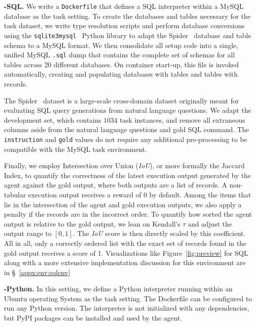 \textbf{\benchmark{}-SQL.} We write a \texttt{Dockerfile} that defines a SQL interpreter within a MySQL database as the task setting.
To create the databases and tables necessary for the task dataset, we write type resolution scripts and perform database conversions using the \texttt{sqlite3mysql}~\cite{sqlite3mysql} Python library to adapt the Spider~\cite{yu-etal-2018-spider} database and table schema to a MySQL format.
We then consolidate all setup code into a single, unified MySQL \texttt{.sql} dump that contains the complete set of schemas for all tables across 20 different databases.
On container start-up, this file is invoked automatically, creating and populating databases with tables and tables with records.

The Spider~\cite{yu-etal-2018-spider} dataset is a large-scale cross-domain dataset originally meant for evaluating SQL query generations from natural language questions. We adapt the development set, which contains $1034$ task instances, and remove all extraneous columns aside from the natural language questions and gold SQL command. The \texttt{instruction} and \texttt{gold} values do not require any additional pre-processing to be compatible with the MySQL task environment.

Finally, we employ Intersection over Union (\textit{IoU}), or more formally the Jaccard Index, to quantify the correctness of the latest execution output generated by the agent against the gold output, where both outputs are a list of records.
A non-tabular execution output receives a reward of 0 by default.
Among the items that lie in the intersection of the agent and gold execution outputs, we also apply a penalty if the records are in the incorrect order.
To quantify how sorted the agent output is relative to the gold output, we lean on Kendall’s $\tau$ and adjust the output range to $[0, 1]$. The \textit{IoU} score is then directly scaled by this coefficient. All in all, only a correctly ordered list with the exact set of records found in the gold output receives a score of 1.
Visualizations like Figure~\ref{fig:preview} for SQL along with a more extensive implementation discussion for this environment are in \S~\ref{appx:env:sqlenv}

\textbf{\benchmark{}-Python.} In this setting, we define a Python interpreter running within an Ubuntu operating System as the task setting.
The Dockerfile can be configured to run any Python version.
The interpreter is not initialized with any dependencies, but PyPI packages can be installed and used by the agent.

